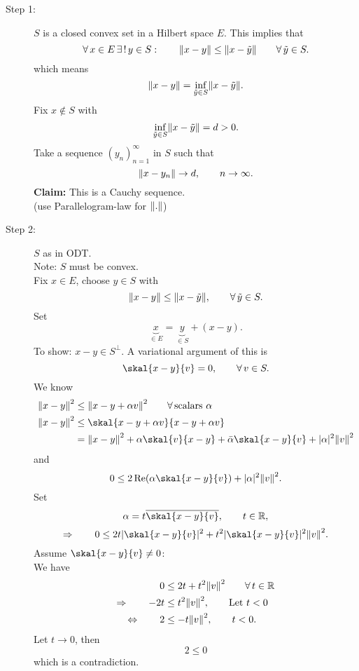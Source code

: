 \begin{beweis}
	\begin{description}
		\item[Step 1:] $S$ is a closed convex set in a Hilbert space $E$. This implies that 
		\[
			\forall\,  x \in E \, \exists\,! \,y \in S: \qquad \norm{x-y} \leq \norm{x- \tilde y} \qquad \forall\, \tilde y \in S.
		\] 
		which means
		\[
			\norm{x-y} = \inf_{\tilde y \in S}\norm{x-\tilde y}.
		\]
		Fix $x \not \in S$ with
		\[
			\inf_{ \tilde y \in S} \norm{x- \tilde y} = d > 0.
		\]
		Take a sequence $(y_n)_{n=1}^{\infty}$ in $S$ such that 
		\[
			\norm{x-y_n} \to d, \qquad n \to \infty.
		\]
		\textbf{Claim:} \text{    } This is a Cauchy sequence. \\
		(use Parallelogram-law for $\norm{.}$)
		\item[Step 2:] $S$ as in ODT. \\
		Note: $S$ must be convex. \\
		Fix $x \in E$, choose $y \in S$ with
		\[
			\norm{x-y} \leq  \norm{x- \tilde y}, \qquad \forall\,  \tilde y \in S.
		\]
		Set
		\[
			\underset{\in E}{\underbrace{x}} = \underset{\in S}{\underbrace{y}} + (x-y).
		\]
		To show: $x-y \in S^{\perp}$. A variational argument of this is 
		\[
			\skal{x-y}{v}= 0, \qquad \forall\, v \in S.
		\]
		We know
		\begin{align*}
			\norm{x-y}^2 &\leq \norm{x-y + \alpha v}^2 \qquad \forall\, \text{scalars }\alpha \\
			\norm{x-y}^2 &\leq \skal{x-y+\alpha v}{x-y+ \alpha v} \\
			&= \norm{x-y}^2+ \alpha \skal{v}{x-y} + \bar{\alpha} \skal{x-y}{v} + \abs{\alpha}^2 \norm{v}^2
		\end{align*}
		and
		\[
			0 \leq 2 \re( \alpha \skal{x-y}{v}) + \abs{\alpha}^2 \norm{v}^2.
		\]
		Set 
		\[
			\alpha = t \overline{\skal{x-y}{v}}, \qquad t \in \mathbb{R},
		\]
		\[
			\Rightarrow \qquad 0 \leq  2 t \abs{\skal{x-y}{v}}^2 + t^2 \abs{\skal{x-y}{v}}^2 \norm{v}^2.
		\]
		Assume $\skal{x-y}{v} \neq 0$: \\
		We have 
		\begin{align*}
			0 &\leq 2t + t^2 \norm{v}^2 \qquad \forall\, t \in \mathbb{R} \\
			\Rightarrow \qquad -2t &\leq  t^2 \norm{v}^2, \qquad \text{Let }t <0 \\
			\Leftrightarrow \qquad 2 &\leq -t \norm{v}^2, \qquad t<0.
		\end{align*}
		Let $t \to 0$, then
		\[
			2 \leq 0
		\]
		which is a contradiction.
	\end{description}
\end{beweis}